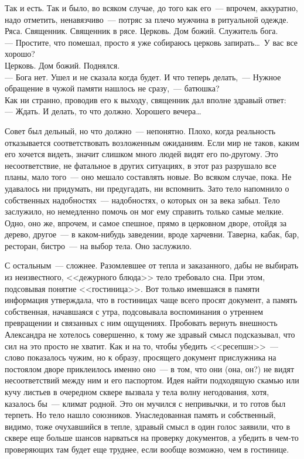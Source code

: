 Так и есть. Так и было, во всяком случае, до того как его~--- впрочем, 
аккуратно, 
надо отметить, ненавязчиво~--- потряс за плечо мужчина в ритуальной одежде. 
Ряса. 
Священник. Священник в рясе. Церковь. Дом божий. Служитель бога.\\
--- Простите, что помешал, просто я уже собираюсь церковь запирать\ldots\ У вас все 
хорошо?\\
Церковь. Дом божий. Поднялся.\\
--- Бога нет. Ушел и не сказала когда будет. И что теперь делать,~--- Нужное 
обращение в чужой памяти нашлось не сразу,~--- батюшка?\\ 
Как ни странно, проводив его к выходу, священник дал вполне здравый ответ:\\
--- Ждать. И делать, то что должно. Хорошего вечера\ldots

Совет был дельный, но что должно~--- непонятно. Плохо, когда реальность 
отказывается соответствовать возложенным ожиданиям. Если мир не таков, каким его 
хочется видеть, значит слишком много людей видят его по-другому. Это 
несоответствие, не фатальное в других ситуациях, в этот раз разрушало все планы, 
мало того~--- оно мешало составлять новые. Во всяком случае, пока. Не удавалось 
ни 
придумать, ни предугадать, ни вспомнить. Зато тело напомнило о собственных 
надобностях~--- надобностях, о которых он за века забыл. Тело заслужило, но 
немедленно помочь он мог ему справить только самые мелкие. Одно, оно же, 
впрочем, и самое спешное, прямо в церковном дворе, отойдя за дерево, другое~--- 
в 
каком-нибудь заведении, вроде харчевни. Таверна, кабак, бар, ресторан, 
бистро~--- 
на выбор тела. Оно заслужило.

С остальным~--- сложнее. Разомлевшее от тепла и заказанного, дабы не выбирать 
из 
неизвестного, <<дежурного блюда>> тело требовало сна. При этом, подсовывая понятие 
<<гостиница>>. Вот только имевшаяся в памяти информация утверждала, что в 
гостиницах чаще всего просят документ, а память собственная, начавшаяся с утра, 
подсовывала воспоминания о утреннем превращении и связанных с ним ощущениях. 
Пробовать вернуть внешность Александра не хотелось совершенно, к тому же здравый 
смысл подсказывал, что сил на это просто не хватит. Как и на то, чтобы убедить 
<<ресепшн>>~--- слово показалось чужим, но к образу, просящего документ 
прислужника 
на постоялом дворе приклеилось именно оно~--- в том, что они (она, он?) не 
видят 
несоответствий между ним и его паспортом. Идея найти подходящую скамью или кучу 
листьев в очередном сквере вызвала у тела волну негодования, хотя, казалось 
бы~--- 
климат родной. Это он мучился с непривычки, и то готов был терпеть. Но тело 
нашло союзников. Унаследованная память и собственный, видимо, тоже очухавшийся в 
тепле, здравый смысл в один голос заявили, что в сквере еще больше шансов 
нарваться на проверку документов, а убедить в чем-то проверяющих там будет еще 
труднее, если вообще возможно, чем в гостинице.

